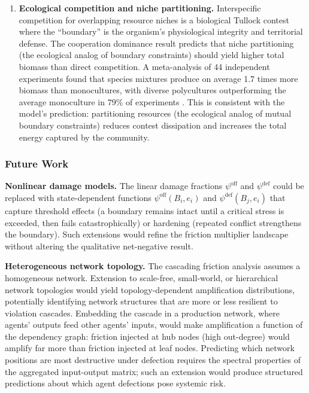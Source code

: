 \documentclass[11pt]{article}
\theoremstyle{plain}
\theoremstyle{definition}
\theoremstyle{remark}
\let\origsubsubsection\subsubsection
\renewcommand{\subsubsection}{\needspace{4\baselineskip}\origsubsubsection}
\begin{document}
\begin{enumerate}
  consistently costs multiples of the bypassed security investment,
  confirming \(\kappa > 1\) in this domain. The network cascading result
  (Theorem~\ref{thm-cascading-friction}) predicts that a single
  compromised node in a supply chain propagates friction across all
  dependent systems. \citet{Crosignani2023} document this effect in the
  2017 NotPetya attack: disruptions at directly compromised firms
  propagated through supply chains to their customers, with aggregate
  downstream losses approximately four times larger than the direct
  losses to the initially targeted firms.
\item
  \textbf{Ecological competition and niche partitioning.} Interspecific
  competition for overlapping resource niches is a biological Tullock
  contest where the ``boundary'' is the organism's physiological
  integrity and territorial defense. The cooperation dominance result
  predicts that niche partitioning (the ecological analog of boundary
  constraints) should yield higher total biomass than direct
  competition. A meta-analysis of 44 independent experiments found that
  species mixtures produce on average 1.7 times more biomass than
  monocultures, with diverse polycultures outperforming the average
  monoculture in 79\% of experiments \citep{Cardinale2007}. This is
  consistent with the model's prediction: partitioning resources (the
  ecological analog of mutual boundary constraints) reduces contest
  dissipation and increases the total energy captured by the community.
\end{enumerate}

\subsubsection{Future Work}\label{future-work-3}

\textbf{Nonlinear damage models.} The linear damage fractions
\(\psi^{\text{off}}\) and \(\psi^{\text{def}}\) could be replaced with
state-dependent functions \(\psi^{\text{off}}(B_i, e_i)\) and
\(\psi^{\text{def}}(B_j, e_i)\) that capture threshold effects (a
boundary remains intact until a critical stress is exceeded, then fails
catastrophically) or hardening (repeated conflict strengthens the
boundary). Such extensions would refine the friction multiplier
landscape without altering the qualitative net-negative result.

\textbf{Heterogeneous network topology.} The cascading friction analysis
assumes a homogeneous network. Extension to scale-free, small-world, or
hierarchical network topologies would yield topology-dependent
amplification distributions, potentially identifying network structures
that are more or less resilient to violation cascades. Embedding the
cascade in a production network, where agents' outputs feed other
agents' inputs, would make amplification a function of the dependency
graph: friction injected at hub nodes (high out-degree) would amplify
far more than friction injected at leaf nodes. Predicting which network
positions are most destructive under defection requires the spectral
properties of the aggregated input-output matrix; such an extension
would produce structured predictions about which agent defections pose
systemic risk.
\end{document}
